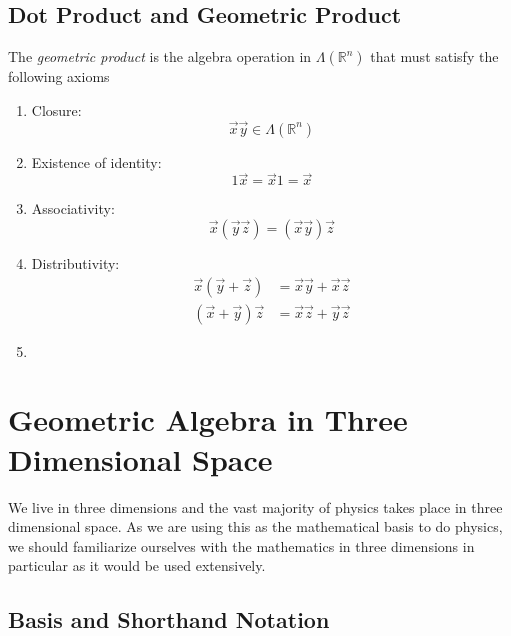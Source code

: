 \documentclass{article}
\numberwithin{equation}{section}
\newcommand{\R}{\mathbb{R}}
\begin{document}
\subsection{Dot Product and Geometric Product}
\begin{definition}
    The \textit{geometric product} is the algebra operation in $\Lambda(\R^n)$ that must satisfy the following axioms 
    \begin{enumerate}
        \item Closure: 
        \begin{equation}
            \vec x\vec y\in\Lambda(\R^n)
        \end{equation}
        \item Existence of identity:
        \begin{equation}
            1\vec x=\vec x1=\vec x
        \end{equation}
        \item Associativity:
        \begin{equation}
            \vec x(\vec y\vec z)=(\vec x\vec y)\vec z
        \end{equation}
        \item Distributivity:
        \begin{align}
            \vec x(\vec y+\vec z)&=\vec x\vec y+\vec x\vec z\\
            (\vec x+\vec y)\vec z&=\vec x\vec z+\vec y\vec z
        \end{align}
        \item 
    \end{enumerate}
\end{definition}

\section{Geometric Algebra in Three Dimensional Space}

We live in three dimensions and the vast majority of physics takes place in three dimensional space. As we are using this as the mathematical basis to do physics, we should familiarize ourselves with the mathematics in three dimensions in particular as it would be used extensively. 

\subsection{Basis and Shorthand Notation}
\end{document}
